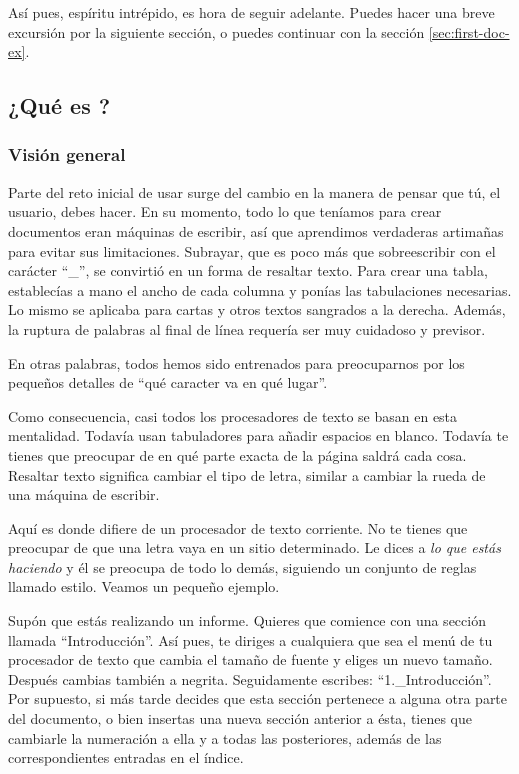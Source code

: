 Así pues, espíritu intrépido, es hora de seguir adelante. Puedes hacer
una breve excursión por la siguiente sección, o puedes continuar con
la sección \ref{sec:first-doc-ex}.


\subsection{¿Qué es \LyX{}?\label{sec:what-is-lyx}}


\subsubsection{Visión general}

Parte del reto inicial de usar \LyX{} surge del cambio en la manera
de pensar que tú, el usuario, debes hacer. En su momento, todo lo
que teníamos para crear documentos eran máquinas de escribir, así
que aprendimos verdaderas artimañas para evitar sus limitaciones.
Subrayar, que es poco más que sobreescribir con el carácter {}``\_'',
se convirtió en un forma de resaltar texto. Para crear una tabla,
establecías a mano el ancho de cada columna y ponías las tabulaciones
necesarias. Lo mismo se aplicaba para cartas y otros textos sangrados
a la derecha. Además, la ruptura de palabras al final de línea requería
ser muy cuidadoso y previsor.

En otras palabras, todos hemos sido entrenados para preocuparnos por
los pequeños detalles de {}``qué caracter va en qué lugar''.

Como consecuencia, casi todos los procesadores de texto se basan en
esta mentalidad. Todavía usan tabuladores para añadir espacios en
blanco. Todavía te tienes que preocupar de en qué parte exacta de
la página saldrá cada cosa. Resaltar texto significa cambiar el tipo
de letra, similar a cambiar la rueda de una máquina de escribir.

Aquí es donde \LyX{} difiere de un procesador de texto corriente.
No te tienes que preocupar de que una letra vaya en un sitio determinado.
Le dices a \LyX{} \emph{lo que estás haciendo} y él se preocupa de
todo lo demás, siguiendo un conjunto de reglas llamado estilo. Veamos
un pequeño ejemplo.

Supón que estás realizando un informe. Quieres que comience con una
sección llamada {}``Introducción''. Así pues, te diriges a cualquiera
que sea el menú de tu procesador de texto que cambia el tamaño de
fuente y eliges un nuevo tamaño. Después cambias también a negrita.
Seguidamente escribes: {}``1.\_Introducción''. Por supuesto, si
más tarde decides que esta sección pertenece a alguna otra parte del
documento, o bien insertas una nueva sección anterior a ésta, tienes
que cambiarle la numeración a ella y a todas las posteriores, además
de las correspondientes entradas en el índice.

